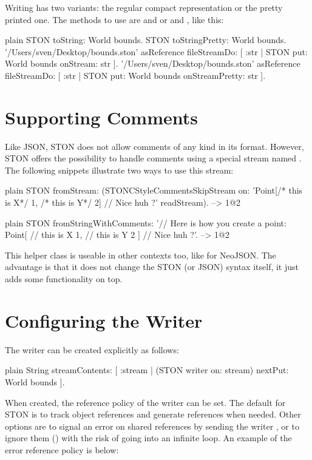 \documentclass[10pt,twoside,english]{_support/latex/sbabook/sbabook}
\begin{document}
Writing has two variants: the regular compact representation or the pretty printed one.
The methods to use are  and 
or  and , like this:

\begin{displaycode}{plain}
STON toString: World bounds.
STON toStringPretty: World bounds.
'/Users/sven/Desktop/bounds.ston' asReference
   fileStreamDo: [ :str |
      STON put: World bounds onStream: str ].
'/Users/sven/Desktop/bounds.ston' asReference
   fileStreamDo: [ :str |
      STON put: World bounds onStreamPretty: str ].
\end{displaycode}
\section{Supporting Comments}
Like JSON, STON does not allow comments of any kind in its format.
However, STON offers the possibility to handle comments using a special stream named .
The following snippets illustrate two ways to use this stream:

\begin{displaycode}{plain}
STON fromStream: (STONCStyleCommentsSkipStream on:
    'Point[/* this is X*/ 1, /* this is Y*/ 2] // Nice huh ?' readStream).
   --> 1@2
\end{displaycode}

\begin{displaycode}{plain}
STON fromStringWithComments: '// Here is how you create a point:
Point[
   // this is X
   1,
   // this is Y
   2 ]
// Nice huh ?'.
   --> 1@2
\end{displaycode}

This helper class is useable in other contexts too, like for NeoJSON.
The advantage is that it does not change the STON (or JSON) syntax itself,
it just adds some functionality on top.
\section{Configuring the Writer}
The writer can be created explicitly as follows:

\begin{displaycode}{plain}
String streamContents: [ :stream |
   (STON writer on: stream)  nextPut: World bounds ].
\end{displaycode}

When created, the reference policy of the writer can be set.
The default for STON is to track object references and generate references when needed.
Other options are to signal an error on shared references by sending the writer , or to ignore them ()
with the risk of going into an infinite loop. An example of the error reference policy is below:
\end{document}
